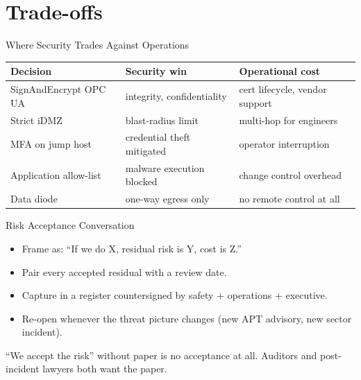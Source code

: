 \documentclass[aspectratio=169,11pt]{beamer}
\begin{document}
\section{Trade-offs}

\begin{frame}{Where Security Trades Against Operations}
\centering
\renewcommand{\arraystretch}{1.3}
\footnotesize
\begin{tabular}{|p{3.6cm}|p{4.2cm}|p{4.2cm}|}
\hline
\rowcolor{slidePanel}
\textbf{Decision} & \textbf{Security win} & \textbf{Operational cost} \\
\hline
SignAndEncrypt OPC UA  & integrity, confidentiality   & cert lifecycle, vendor support \\
Strict iDMZ            & blast-radius limit            & multi-hop for engineers \\
MFA on jump host       & credential theft mitigated   & operator interruption \\
Application allow-list & malware execution blocked    & change control overhead \\
Data diode             & one-way egress only           & no remote control at all \\
\hline
\end{tabular}
\end{frame}

\begin{frame}{Risk Acceptance Conversation}
\begin{itemize}
  \item Frame as: ``If we do X, residual risk is Y, cost is Z.''
  \item Pair every accepted residual with a review date.
  \item Capture in a register countersigned by safety + operations + executive.
  \item Re-open whenever the threat picture changes (new APT advisory, new sector incident).
\end{itemize}
\begin{warnbox}
``We accept the risk'' without paper is no acceptance at all. Auditors and post-incident lawyers both want the paper.
\end{warnbox}
\end{frame}
\end{document}
